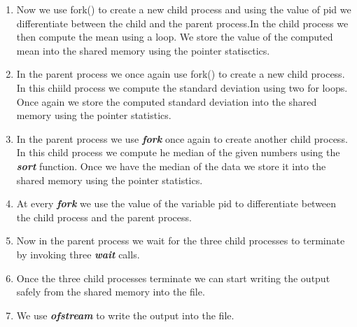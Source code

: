 \documentclass[a4paper,12pt]{report}
\begin{document}
\begin{enumerate}
\item Now we use fork() to create a new child process and using the value of pid we differentiate between the child and the parent process.In the child process we then compute the mean using a loop. We store the value of the computed mean into the shared memory using the pointer statisctics.
\item In the parent process we once again use fork() to create a new child process. In this chiild process we compute the standard deviation using two for loops. Once again we store the computed standard deviation into the shared memory using the pointer statistics.
\item In the parent process we use \textit{\textbf{fork}} once again to create another child process. In this child process we compute he median of the given numbers using the \textit{\textbf{sort}} function. Once we have the median of the data we store it into the shared memory using the pointer statistics.
\item At every \textit{\textbf{fork}} we use the value of the variable pid to differentiate between the child process and the parent process.
\item Now in the parent process we wait for the three child processes to terminate by invoking three \textit{\textbf{wait}} calls. 
\item Once the three child processes terminate we can start writing the output safely from the shared memory into the file.
\item We use \textit{\textbf{ofstream}} to write the output into the file.
\end{enumerate}
\end{document}
